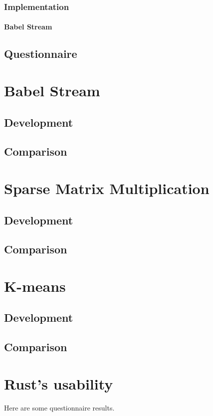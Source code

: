 \documentclass[12pt,a4paper]{report}
\begin{document}
\subsection{Implementation}
\subsubsection{Babel Stream}

\section{Questionnaire}


\chapter{Babel Stream}
\section{Development}
\section{Comparison}


\chapter{Sparse Matrix Multiplication}
\section{Development}
\section{Comparison}

\chapter{K-means}
\section{Development}
\section{Comparison}

\chapter{Rust's usability}
Here are some questionnaire results.
\end{document}
